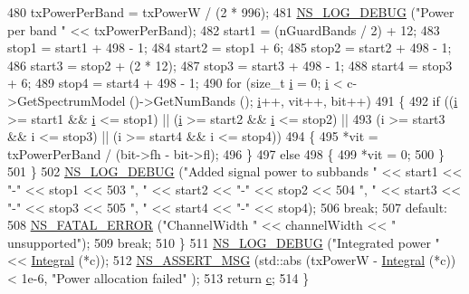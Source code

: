 \begin{DoxyCode}
480       txPowerPerBand = txPowerW / (2 * 996);
481       \hyperlink{group__logging_ga413f1886406d49f59a6a0a89b77b4d0a}{NS\_LOG\_DEBUG} (\textcolor{stringliteral}{"Power per band "} << txPowerPerBand);
482       start1 = (nGuardBands / 2) + 12;
483       stop1 = start1 + 498 - 1;
484       start2 = stop1 + 6;
485       stop2 = start2 + 498 - 1;
486       start3 = stop2 + (2 * 12);
487       stop3 = start3 + 498 - 1;
488       start4 = stop3 + 6;
489       stop4 = start4 + 498 - 1;
490       \textcolor{keywordflow}{for} (\textcolor{keywordtype}{size\_t} \hyperlink{bernuolliDistribution_8m_a6f6ccfcf58b31cb6412107d9d5281426}{i} = 0; \hyperlink{bernuolliDistribution_8m_a6f6ccfcf58b31cb6412107d9d5281426}{i} < c->GetSpectrumModel ()->GetNumBands (); \hyperlink{bernuolliDistribution_8m_a6f6ccfcf58b31cb6412107d9d5281426}{i}++, vit++, bit++)
491         \{
492           \textcolor{keywordflow}{if} ((\hyperlink{bernuolliDistribution_8m_a6f6ccfcf58b31cb6412107d9d5281426}{i} >= start1 && \hyperlink{bernuolliDistribution_8m_a6f6ccfcf58b31cb6412107d9d5281426}{i} <= stop1) || (\hyperlink{bernuolliDistribution_8m_a6f6ccfcf58b31cb6412107d9d5281426}{i} >= start2 && \hyperlink{bernuolliDistribution_8m_a6f6ccfcf58b31cb6412107d9d5281426}{i} <= stop2) ||
493               (i >= start3 && i <= stop3) || (i >= start4 && i <= stop4))
494             \{
495               *vit = txPowerPerBand / (bit->fh - bit->fl);
496             \}
497           \textcolor{keywordflow}{else}
498             \{
499               *vit = 0;
500             \}
501         \}
502       \hyperlink{group__logging_ga413f1886406d49f59a6a0a89b77b4d0a}{NS\_LOG\_DEBUG} (\textcolor{stringliteral}{"Added signal power to subbands "} << start1 << \textcolor{stringliteral}{"-"} << stop1 <<
503                     \textcolor{stringliteral}{", "} << start2 << \textcolor{stringliteral}{"-"} << stop2 <<
504                     \textcolor{stringliteral}{", "} << start3 << \textcolor{stringliteral}{"-"} << stop3 <<
505                     \textcolor{stringliteral}{", "} << start4 << \textcolor{stringliteral}{"-"} << stop4);
506       \textcolor{keywordflow}{break};
507     \textcolor{keywordflow}{default}:
508       \hyperlink{group__fatal_ga5131d5e3f75d7d4cbfd706ac456fdc85}{NS\_FATAL\_ERROR} (\textcolor{stringliteral}{"ChannelWidth "} << channelWidth << \textcolor{stringliteral}{" unsupported"});
509       \textcolor{keywordflow}{break};
510     \}
511   \hyperlink{group__logging_ga413f1886406d49f59a6a0a89b77b4d0a}{NS\_LOG\_DEBUG} (\textcolor{stringliteral}{"Integrated power "} << \hyperlink{namespacens3_a3dd3817567502f8bc77b04e47134c070}{Integral} (*c));
512   \hyperlink{assert_8h_aff5ece9066c74e681e74999856f08539}{NS\_ASSERT\_MSG} (std::abs (txPowerW - \hyperlink{namespacens3_a3dd3817567502f8bc77b04e47134c070}{Integral} (*c)) < 1e-6, \textcolor{stringliteral}{"Power allocation failed"}
      );
513   \textcolor{keywordflow}{return} \hyperlink{lte_2model_2fading-traces_2fading__trace__generator_8m_ae0323a9039add2978bf5b49550572c7c}{c};
514 \}
\end{DoxyCode}


